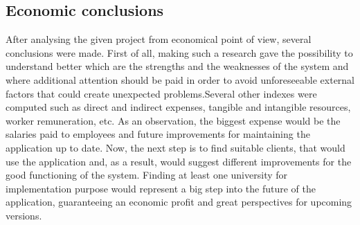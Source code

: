 \subsection{Economic conclusions}
After analysing the given project from economical point of view, several conclusions were made. First of all, making such a research gave the possibility to understand better which are the strengths  and the weaknesses of the system and where additional attention should be paid in order to avoid unforeseeable external factors that could create unexpected problems.Several other indexes were computed such as direct and indirect expenses, tangible and intangible resources, worker remuneration, etc. As an observation, the biggest expense would be the salaries paid to employees and future improvements for maintaining the application up to date. Now, the next step is to find suitable clients, that would use the application  and, as a result, would suggest different improvements for the good functioning of the system. Finding at least one university for implementation purpose would represent a big step into the future of the application, guaranteeing an economic profit and great perspectives for upcoming versions.
\clearpage